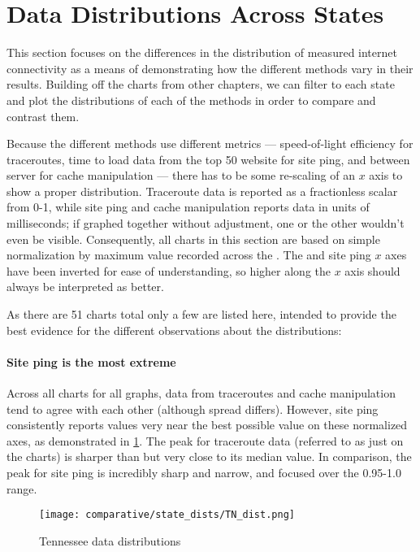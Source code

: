 \section{Data Distributions Across States}\label{sec:comparative-distribution}

This section focuses on the differences in the distribution of measured internet connectivity as a means of demonstrating how the different methods vary in their results. Building off the \kde charts from other chapters, we can filter to each state and plot the distributions of each of the methods in order to compare and contrast them.

Because the different methods use different metrics --- speed-of-light efficiency for traceroutes, time to load data from the top 50 website for site ping, and \rtt between \dns server for \dns cache manipulation --- there has to be some re-scaling of an $x$ axis to show a proper distribution. Traceroute data is reported as a fractionless scalar from 0-1, while site ping and \dns cache manipulation reports data in units of milliseconds; if graphed together without adjustment, one or the other wouldn't even be visible. Consequently, all charts in this section are based on simple normalization by maximum value recorded across the \us. The \dns and site ping $x$ axes have been inverted for ease of understanding, so higher along the $x$ axis should always be interpreted as better.

As there are 51 charts total only a few are listed here, intended to provide the best evidence for the different observations about the distributions:

\paragraph{Site ping is the most extreme} Across all \kde charts for all graphs, data from traceroutes and \dns cache manipulation tend to agree with each other (although spread differs). However, site ping consistently reports values very near the best possible value on these normalized axes, as demonstrated in \cref{fig:comparative_tn_dist}. The peak for traceroute data (referred to as just \caida on the charts) is sharper than \dns but very close to its median value. In comparison, the peak for site ping is incredibly sharp and narrow, and focused over the 0.95-1.0 range.

\begin{figure}[h]
    \centering
    \texttt{[image: comparative/state\_dists/TN\_dist.png]}
    \caption{Tennessee data distributions}
    \label{fig:comparative_tn_dist}
\end{figure}

